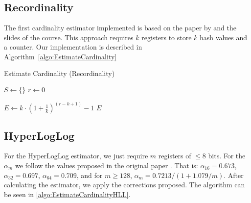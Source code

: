 \documentclass[a4paper, 11pt]{article}
\begin{document}
\newpage

\subsection{Recordinality}
The first cardinality estimator implemented is based on the paper by \textcite{Recordinality} and the slides of the course. This approach requires $k$ registers to store $k$ hash values and a counter. Our implementation is described in Algorithm~\ref{algo:EstimateCardinality}

\begin{algorithm}[H]
    \caption{Estimate Cardinality (Recordinality)}
    \label{algo:EstimateCardinality}
    \SetAlgoLined
    \BlankLine


    $S \gets \{\}$\; 
    $r \gets 0$\;

    \BlankLine

    \BlankLine

    \BlankLine
    $E \gets k \cdot (1 + \frac{1}{k})^{(r - k + 1)} - 1$\;
    \Return $E$\;
\end{algorithm}


\subsection{HyperLogLog}
For the HyperLogLog estimator, we just require $m$ registers of $\le 8$ bits. For the $\alpha_m$ we follow the values proposed in the original paper \textcite{HyperLogLog}. That is: $\alpha_{16} = 0.673$, $\alpha_{32} = 0.697$, $\alpha_{64} = 0.709$, and for $m \ge 128$, $\alpha_{m} = 0.7213/(1+1.079/m)$. After calculating the estimator, we apply the corrections proposed. The algorithm can be seen in \ref{algo:EstimateCardinalityHLL}.
\end{document}
